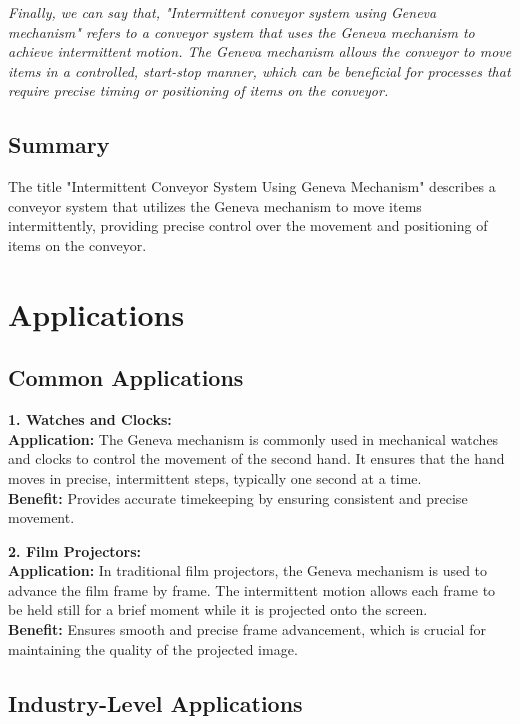 \documentclass[a4paper,12pt]{article}
\begin{document}
\textit{Finally, we can say that, "Intermittent conveyor system using Geneva mechanism" refers to a conveyor system that uses the Geneva mechanism to achieve intermittent motion. The Geneva mechanism allows the conveyor to move items in a controlled, start-stop manner, which can be beneficial for processes that require precise timing or positioning of items on the conveyor.}

\subsection*{Summary}
The title "Intermittent Conveyor System Using Geneva Mechanism" describes a conveyor system that utilizes the Geneva mechanism to move items intermittently, providing precise control over the movement and positioning of items on the conveyor.

\section*{\centering \textbf{Applications}}

\subsection*{Common Applications}

\textbf{1. Watches and Clocks:}\\
\hspace*{4ex} \textbf{Application:} The Geneva mechanism is commonly used in mechanical watches and clocks to control the movement of the second hand. It ensures that the hand moves in precise, intermittent steps, typically one second at a time.\\
\hspace*{4ex} \textbf{Benefit:} Provides accurate timekeeping by ensuring consistent and precise movement.

\textbf{2. Film Projectors:}\\
\hspace*{4ex} \textbf{Application:} In traditional film projectors, the Geneva mechanism is used to advance the film frame by frame. The intermittent motion allows each frame to be held still for a brief moment while it is projected onto the screen.\\
\hspace*{4ex} \textbf{Benefit:} Ensures smooth and precise frame advancement, which is crucial for maintaining the quality of the projected image.

\subsection*{Industry-Level Applications}
\end{document}
